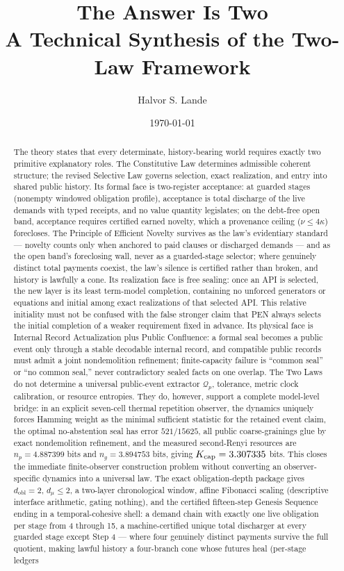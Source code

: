 \documentclass[11pt]{article}
\title{\textbf{The Answer Is Two}\\
\large A Technical Synthesis of the Two-Law Framework}
\author{Halvor S. Lande}
\date{\today}
\theoremstyle{plain}
\theoremstyle{definition}
\theoremstyle{remark}
\begin{document}
\maketitle

\begin{abstract}
The theory states that every determinate, history-bearing world requires exactly two primitive explanatory roles. The Constitutive Law determines admissible coherent structure; the revised Selective Law governs selection, exact realization, and entry into shared public history. Its formal face is two-register acceptance: at guarded stages (nonempty windowed obligation profile), acceptance is total discharge of the live demands with typed receipts, and no value quantity legislates; on the debt-free open band, acceptance requires certified earned novelty, which a provenance ceiling (\(\nu\le4\kappa\)) forecloses. The Principle of Efficient Novelty survives as the law's evidentiary standard --- novelty counts only when anchored to paid clauses or discharged demands --- and as the open band's foreclosing wall, never as a guarded-stage selector; where genuinely distinct total payments coexist, the law's silence is certified rather than broken, and history is lawfully a cone. Its realization face is free sealing: once an API is selected, the new layer is its least term-model completion, containing no unforced generators or equations and initial among exact realizations of that selected API. This relative initiality must not be confused with the false stronger claim that PEN always selects the initial completion of a weaker requirement fixed in advance. Its physical face is Internal Record Actualization plus Public Confluence: a formal seal becomes a public event only through a stable decodable internal record, and compatible public records must admit a joint nondemolition refinement; finite-capacity failure is ``common seal'' or ``no common seal,'' never contradictory sealed facts on one overlap. The Two Laws do not determine a universal public-event extractor \(\mathcal Q_p\), tolerance, metric clock calibration, or resource entropies. They do, however, support a complete model-level bridge: in an explicit seven-cell thermal repetition observer, the dynamics uniquely forces Hamming weight as the minimal sufficient statistic for the retained event claim, the optimal no-abstention seal has error \(521/15625\), all public coarse-grainings glue by exact nondemolition refinement, and the measured second-Renyi resources are \(n_p=4.887399\) bits and \(n_g=3.894753\) bits, giving \(K_{\rm cap}=3.307335\) bits. This closes the immediate finite-observer construction problem without converting an observer-specific dynamics into a universal law. The exact obligation-depth package gives \(d_{\mathrm{obl}}=2\), \(d_\mu\le2\), a two-layer chronological window, affine Fibonacci scaling (descriptive interface arithmetic, gating nothing), and the certified fifteen-step Genesis Sequence ending in a temporal-cohesive shell: a demand chain with exactly one live obligation per stage from 4 through 15, a machine-certified unique total discharger at every guarded stage except Step 4 --- where four genuinely distinct payments survive the full quotient, making lawful history a four-branch cone whose futures heal (per-stage ledgers 
\end{abstract}
\end{document}
